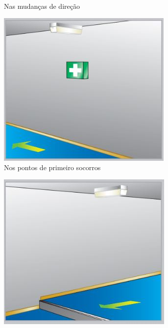 \begin{figure}[H]
\begin{subfigure}[b]{0.30\textwidth}
			\caption{Nas mudanças de direção}
			\label{fig: style 1 emergency e}
		\end{subfigure}
		\hfill
		\begin{subfigure}[b]{0.30\textwidth}
			\centering
			\includegraphics[width=\textwidth]{Figures/3. Lighting/light-safety6.jpg}
			\caption{Nos pontos de primeiro socorros}
			\label{fig: style 1 emergency f}
		\end{subfigure}
		\begin{subfigure}[b]{0.30\textwidth}
			\centering
			\includegraphics[width=\textwidth]{Figures/3. Lighting/light-safety7.jpg}

\end{subfigure}
\end{figure}
